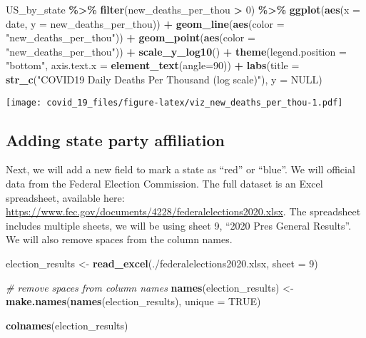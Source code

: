 \documentclass[
]{article}
\newenvironment{Shaded}{\begin{snugshade}}{\end{snugshade}}
\newcommand{\AttributeTok}[1]{\textcolor[rgb]{0.13,0.29,0.53}{#1}}
\newcommand{\CommentTok}[1]{\textcolor[rgb]{0.56,0.35,0.01}{\textit{#1}}}
\newcommand{\ConstantTok}[1]{\textcolor[rgb]{0.56,0.35,0.01}{#1}}
\newcommand{\DecValTok}[1]{\textcolor[rgb]{0.00,0.00,0.81}{#1}}
\newcommand{\FunctionTok}[1]{\textcolor[rgb]{0.13,0.29,0.53}{\textbf{#1}}}
\newcommand{\NormalTok}[1]{#1}
\newcommand{\OtherTok}[1]{\textcolor[rgb]{0.56,0.35,0.01}{#1}}
\newcommand{\SpecialCharTok}[1]{\textcolor[rgb]{0.81,0.36,0.00}{\textbf{#1}}}
\newcommand{\StringTok}[1]{\textcolor[rgb]{0.31,0.60,0.02}{#1}}
\begin{document}
\begin{Shaded}
\begin{Highlighting}[]
\NormalTok{US\_by\_state }\SpecialCharTok{\%\textgreater{}\%}
  \FunctionTok{filter}\NormalTok{(new\_deaths\_per\_thou }\SpecialCharTok{\textgreater{}} \DecValTok{0}\NormalTok{) }\SpecialCharTok{\%\textgreater{}\%}
  \FunctionTok{ggplot}\NormalTok{(}\FunctionTok{aes}\NormalTok{(}\AttributeTok{x =}\NormalTok{ date, }\AttributeTok{y =}\NormalTok{ new\_deaths\_per\_thou)) }\SpecialCharTok{+}
  \FunctionTok{geom\_line}\NormalTok{(}\FunctionTok{aes}\NormalTok{(}\AttributeTok{color =} \StringTok{"new\_deaths\_per\_thou"}\NormalTok{)) }\SpecialCharTok{+}
  \FunctionTok{geom\_point}\NormalTok{(}\FunctionTok{aes}\NormalTok{(}\AttributeTok{color =} \StringTok{"new\_deaths\_per\_thou"}\NormalTok{)) }\SpecialCharTok{+}
  \FunctionTok{scale\_y\_log10}\NormalTok{() }\SpecialCharTok{+}
  \FunctionTok{theme}\NormalTok{(}\AttributeTok{legend.position =} \StringTok{"bottom"}\NormalTok{, }\AttributeTok{axis.text.x =} \FunctionTok{element\_text}\NormalTok{(}\AttributeTok{angle=}\DecValTok{90}\NormalTok{)) }\SpecialCharTok{+}
  \FunctionTok{labs}\NormalTok{(}\AttributeTok{title =} \FunctionTok{str\_c}\NormalTok{(}\StringTok{"COVID19 Daily Deaths Per Thousand (log scale)"}\NormalTok{), }\AttributeTok{y =} \ConstantTok{NULL}\NormalTok{)}
\end{Highlighting}
\end{Shaded}

\texttt{[image: covid\_19\_files/figure-latex/viz\_new\_deaths\_per\_thou-1.pdf]}

\hypertarget{adding-state-party-affiliation}{%
\subsection{Adding state party
affiliation}\label{adding-state-party-affiliation}}

Next, we will add a new field to mark a state as ``red'' or ``blue''. We
will official data from the Federal Election Commission. The full
dataset is an Excel spreadsheet, available here:
\url{https://www.fec.gov/documents/4228/federalelections2020.xlsx}. The
spreadsheet includes multiple sheets, we will be using sheet 9, ``2020
Pres General Results''. We will also remove spaces from the column
names.

\begin{Shaded}
\begin{Highlighting}[]
\NormalTok{election\_results }\OtherTok{\textless{}{-}} \FunctionTok{read\_excel}\NormalTok{(}\StringTok{\textquotesingle{}./federalelections2020.xlsx\textquotesingle{}}\NormalTok{, }\AttributeTok{sheet =} \DecValTok{9}\NormalTok{)}

\CommentTok{\# remove spaces from column names}
\FunctionTok{names}\NormalTok{(election\_results) }\OtherTok{\textless{}{-}} \FunctionTok{make.names}\NormalTok{(}\FunctionTok{names}\NormalTok{(election\_results), }\AttributeTok{unique =} \ConstantTok{TRUE}\NormalTok{)}

\FunctionTok{colnames}\NormalTok{(election\_results)}
\end{Highlighting}
\end{Shaded}
\end{document}
